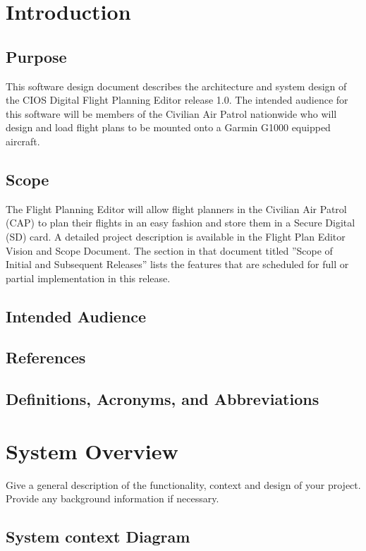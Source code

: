 \documentclass[12pt, letterpaper]{article}
\begin{document}
\newpage


\section{Introduction}
  \subsection{Purpose}
    This software design document describes the architecture and system design of the CIOS Digital Flight Planning Editor release 1.0.
    The intended audience for this software will be members of the Civilian Air Patrol nationwide who will design and load flight plans to be mounted onto a Garmin G1000 equipped aircraft.

\subsection{Scope}
  The Flight Planning Editor will allow flight planners in the Civilian Air Patrol (CAP) to plan their flights in an easy fashion and store them in a Secure Digital (SD) card. A detailed project description is available in the Flight Plan Editor Vision and Scope Document. The section in that document titled ”Scope of Initial and Subsequent Releases” lists the features that are scheduled for full or partial implementation in this release.

  \subsection{Intended Audience}

  \subsection{References}

  \subsection{Definitions, Acronyms, and Abbreviations}

\section{System Overview}
Give a general description of the functionality, context and design of your project. Provide any background information if necessary.
  \subsection{System context Diagram}
\end{document}
